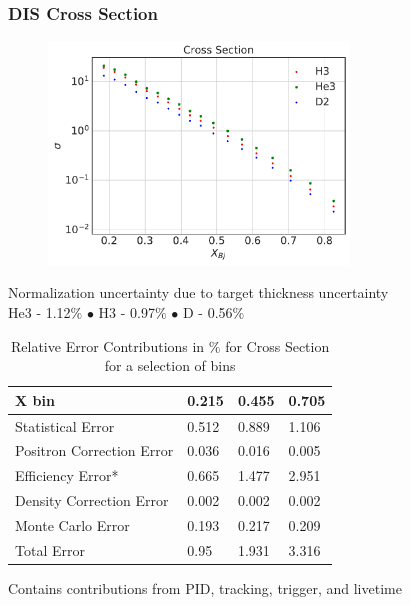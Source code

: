 \documentclass[12pt]{beamer}
\begin{document}
\begin{frame}{}
\frametitle{DIS Cross Section}
\centering
\begin{figure}
	\includegraphics[width=8cm]{../images/total_xs.pdf}
\end{figure}

Normalization uncertainty due to target thickness uncertainty\\
He3 - 1.12$\%$ $\bullet$ H3 - 0.97$\%$ $\bullet$  D - 0.56$\%$
\end{frame}
\begin{frame}{}
\begin{table}[]
		\caption*{Relative Error Contributions in $\%$ for Cross Section for a selection of bins}
	\begin{tabular}{|l|l|l|l|}
		\hline
		X bin                        & 0.215 & 0.455 & 0.705 \\ \hline
		Statistical Error            & 0.512 & 0.889 & 1.106 \\ \hline
		Positron Correction Error    & 0.036 & 0.016 & 0.005 \\ \hline
		Efficiency Error*            & 0.665 & 1.477 & 2.951 \\ \hline
		Density Correction Error     & 0.002 & 0.002 & 0.002 \\ \hline
		Monte Carlo Error            & 0.193 & 0.217 & 0.209 \\ \hline
		Total Error		 	 		 & 0.95  & 1.931 & 3.316 \\ \hline
	\end{tabular}
\end{table}
\centering	* Contains contributions from PID, tracking, trigger, and livetime

\end{frame}
\end{document}
